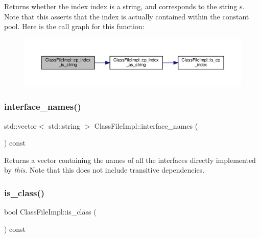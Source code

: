 Returns whether the index {\ttfamily index} is a string, and corresponds to the string {\ttfamily s}. Note that this asserts that the index is actually contained within the constant pool. Here is the call graph for this function\+:\nopagebreak
\begin{figure}[H]
\begin{center}
\leavevmode
\includegraphics[width=350pt]{classClassFileImpl_ab84cd50d25d163274a299ba682f57610_cgraph}
\end{center}
\end{figure}
\mbox{\label{classClassFileImpl_ad2154cb52119b87cd74b722b69730dee}} 
\subsubsection{\texorpdfstring{interface\+\_\+names()}{interface\_names()}}
{\footnotesize\ttfamily std\+::vector$<$ std\+::string $>$ Class\+File\+Impl\+::interface\+\_\+names (\begin{DoxyParamCaption}{ }\end{DoxyParamCaption}) const}

Returns a vector containing the names of all the interfaces directly implemented by {\itshape this}. Note that this does not include transitive dependencies. \mbox{\label{classClassFileImpl_a3772a57b8eaadf252a9a9f36c063ab93}} 
\subsubsection{\texorpdfstring{is\+\_\+class()}{is\_class()}}
{\footnotesize\ttfamily bool Class\+File\+Impl\+::is\+\_\+class (\begin{DoxyParamCaption}{ }\end{DoxyParamCaption}) const}

